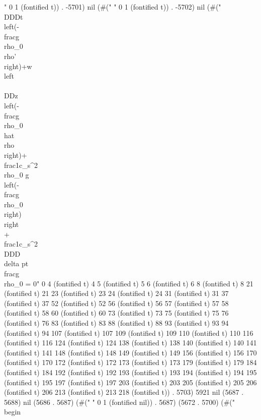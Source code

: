 " 0 1 (fontified t)) . -5701) nil (#(" " 0 1 (fontified t)) . -5702) nil (#("\\DDD{}{t}\\left(-\\frac{g}{\\rho_0}\\rho'\\right)+w\\left\\{\\DD{}{z}\\left(-\\frac{g}{\\rho_0}\\hat{\\rho}\\right)+\\frac{1}{c_s^2}\\rho_0
 g\\left(-\\frac{g}{\\rho_0}\\right)\\right\\}+\\frac{1}{c_s^2}\\DDD{\\delta
 p}{t}\\frac{g}{\\rho_0} = 0" 0 4 (fontified t) 4 5 (fontified t) 5 6 (fontified t) 6 8 (fontified t) 8 21 (fontified t) 21 23 (fontified t) 23 24 (fontified t) 24 31 (fontified t) 31 37 (fontified t) 37 52 (fontified t) 52 56 (fontified t) 56 57 (fontified t) 57 58 (fontified t) 58 60 (fontified t) 60 73 (fontified t) 73 75 (fontified t) 75 76 (fontified t) 76 83 (fontified t) 83 88 (fontified t) 88 93 (fontified t) 93 94 (fontified t) 94 107 (fontified t) 107 109 (fontified t) 109 110 (fontified t) 110 116 (fontified t) 116 124 (fontified t) 124 138 (fontified t) 138 140 (fontified t) 140 141 (fontified t) 141 148 (fontified t) 148 149 (fontified t) 149 156 (fontified t) 156 170 (fontified t) 170 172 (fontified t) 172 173 (fontified t) 173 179 (fontified t) 179 184 (fontified t) 184 192 (fontified t) 192 193 (fontified t) 193 194 (fontified t) 194 195 (fontified t) 195 197 (fontified t) 197 203 (fontified t) 203 205 (fontified t) 205 206 (fontified t) 206 213 (fontified t) 213 218 (fontified t)) . 5703) 5921 nil (5687 . 5688) nil (5686 . 5687) (#(" " 0 1 (fontified nil)) . 5687) (5672 . 5700) (#("\\begin{}
